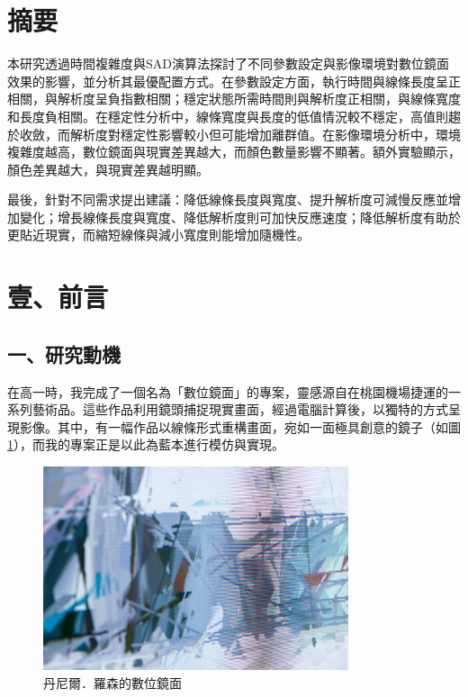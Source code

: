 \documentclass[12pt]{article}
\begin{document}
\section{摘要}

本研究透過時間複雜度與SAD演算法探討了不同參數設定與影像環境對數位鏡面效果的影響，並分析其最優配置方式。在參數設定方面，執行時間與線條長度呈正相關，與解析度呈負指數相關；穩定狀態所需時間則與解析度正相關，與線條寬度和長度負相關。在穩定性分析中，線條寬度與長度的低值情況較不穩定，高值則趨於收斂，而解析度對穩定性影響較小但可能增加離群值。在影像環境分析中，環境複雜度越高，數位鏡面與現實差異越大，而顏色數量影響不顯著。額外實驗顯示，顏色差異越大，與現實差異越明顯。

最後，針對不同需求提出建議：降低線條長度與寬度、提升解析度可減慢反應並增加變化；增長線條長度與寬度、降低解析度則可加快反應速度；降低解析度有助於更貼近現實，而縮短線條與減小寬度則能增加隨機性。

\newpage

\section{壹、前言}

\subsection{一、研究動機}

在高一時，我完成了一個名為「數位鏡面」的專案，靈感源自\textcite{husart}在桃園機場捷運的一系列藝術品。這些作品利用鏡頭捕捉現實畫面，經過電腦計算後，以獨特的方式呈現影像。其中，有一幅作品以線條形式重構畫面，宛如一面極具創意的鏡子（如圖\ref{fig:mirror_example_1}），而我的專案正是以此為藍本進行模仿與實現。

\begin{figure}[htbp]
  \centering
  \includegraphics[width=0.8\textwidth]{img//mirror_example_1.jpg}
  \caption{丹尼爾．羅森的數位鏡面}\label{fig:mirror_example_1}
\end{figure}
\end{document}

